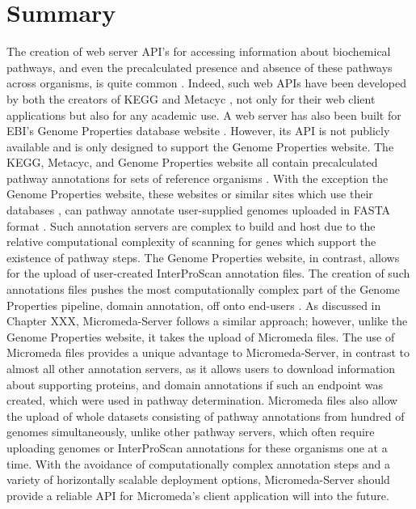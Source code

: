 \section{Summary}

The creation of web server API's for accessing information about biochemical pathways, and even the precalculated presence and absence of these pathways across organisms, is quite common \cite{wu2006kobas,moriya2010pathpred,pireddu2006path,vallenet2009microscope,aziz2008rast,takami2016automated,moriya2007kaas,chou2009fmm}. Indeed, such web APIs have been developed by both the creators of KEGG \cite{kawashima2003kegg} and Metacyc \cite{karp2013data}, not only for their web client applications but also for any academic use. A web server has also been built for EBI's Genome Properties database website \cite{richardson2018genome}. However, its API is not publicly available and is only designed to support the Genome Properties website. The KEGG, Metacyc, and Genome Properties website all contain precalculated pathway annotations for sets of reference organisms \cite{kanehisa2000kegg,karp2002metacyc,karp2013data}. With the exception the Genome Properties website, these websites \cite{kanehisa2016blastkoala} or similar sites which use their databases \cite{chou2009fmm,moriya2007kaas,takami2016automated}, can pathway annotate user-supplied genomes uploaded in FASTA format \cite{pearson19905}. Such annotation servers are complex to build and host due to the relative computational complexity of scanning for genes which support the existence of pathway steps. The Genome Properties website, in contrast, allows for the upload of user-created InterProScan annotation files. The creation of such annotations files pushes the most computationally complex part of the Genome Properties pipeline, domain annotation, off onto end-users \cite{richardson2018genome}. As discussed in Chapter XXX, Micromeda-Server follows a similar approach; however, unlike the Genome Properties website, it takes the upload of Micromeda files. The use of Micromeda files provides a unique advantage to Micromeda-Server, in contrast to almost all other annotation servers, as it allows users to download information about supporting proteins, and domain annotations if such an endpoint was created, which were used in pathway determination. Micromeda files also allow the upload of whole datasets consisting of pathway annotations from hundred of genomes simultaneously, unlike other pathway servers, which often require uploading genomes or InterProScan annotations for these organisms one at a time. With the avoidance of computationally complex annotation steps and a variety of horizontally scalable deployment options, Micromeda-Server should provide a reliable API for Micromeda's client application will into the future.
